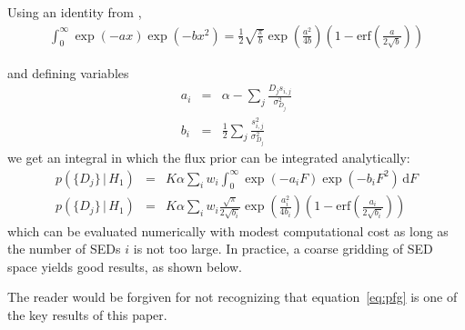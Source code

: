\documentclass[11pt,letterpaper,linenumbers]{aastex7}
\newcommand{\equationname}{equation}
\newcommand{\eqnref}[1]{\mbox{\equationname~\ref{#1}}}
\newcommand{\dd}{\mathrm{d}}
\newcommand{\erf}{\textrm{erf}}
\newcommand{\fg}{\ensuremath{H_1}}
\newcommand{\given}{\,\vert\,}
\newcommand{\changed}[1]{#1}
\begin{document}
\changed{
Using an identity from \cite{gr1980},
\begin{eqnarray}
  \int_0^{\infty} \exp(-a x) \exp(-b x^2) =
  \frac{1}{2}
  \sqrt{\frac{\pi}{b}}
  \exp\left(\frac{a^2}{4 b}\right)
  \left(1 - \erf\left(\frac{a}{2 \sqrt{b}}\right)\right)
\end{eqnarray}
}
and defining variables
\begin{eqnarray}
  a_i &=& \alpha - \sum_j \frac{D_j s_{i,j}}{\sigma_{D_j}^2} \\
  b_i &=& \frac{1}{2} \sum_j \frac{s_{i,j}^2}{\sigma_{D_j}^2}
\end{eqnarray}
we get an integral in which the flux prior can be integrated analytically:
%
\begin{eqnarray}
  p(\{ D_j \} \given \fg)
  &=&
  K \alpha
  \sum_i w_i 
  \int_0^{\infty}
    \exp(-a_i F) \exp(-b_i F^2)
    \, \dd F
    \\
  p(\{ D_j \} \given \fg)
  &=&
  K \alpha
  \sum_i w_i 
  \frac{\sqrt{\pi}}{2 \sqrt{b_i}}
  \exp \left(\frac{a_i^2}{4 b_i} \right)
  \left(1 - \erf\left( \frac{a_i}{2 \sqrt{b_i}} \right) \right)
  \label{eq:pfg}
\end{eqnarray}
which can be evaluated numerically with modest computational cost as
long as the number of SEDs $i$ is not too large.  In practice, a
coarse gridding of SED space yields good results, as shown below.
\changed{
The reader would be forgiven for not recognizing that \eqnref{eq:pfg} is one of the
key results of this paper.
}


\end{document}
